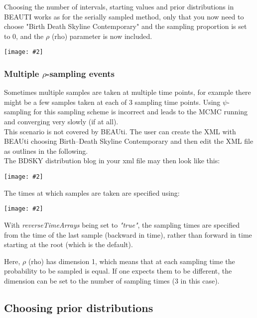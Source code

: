 \documentclass[11pt]{article}
\newcommand{\includeimage}[2][]{%
\texttt{[image: \#2]}
}
\begin{document}
Choosing the number of intervals, starting values and prior distributions in BEAUTI works as for the serially sampled method, only that you now need to choose "Birth Death Skyline Contemporary" and the sampling proportion is set to 0, and the $\rho$ (rho) parameter is now included.
\begin{center}
\includeimage[width=.5\linewidth]{figures/BEAUTI_bdsky_contemp}
\end{center}

\subsubsection{Multiple $\rho$-sampling events}
\label{Extensions}

Sometimes multiple samples are taken at multiple time points, for example there might be a few samples taken at each of 3 sampling time points. Using $\psi$-sampling for this sampling scheme is incorrect and leads to the MCMC running and converging very slowly (if at all).\\

This scenario is not covered by BEAUti. The user can create the XML with BEAUti choosing Birth--Death Skyline Contemporary and then edit the XML file as outlines in the following.\\

The BDSKY distribution blog in your xml file may then look like this: 
\begin{center}
\includeimage[width=\linewidth]{figures/multiplerho}
\end{center}

The times at which samples are taken are specified using:
\begin{center}
\includeimage[width=\linewidth]{figures/multiplerhotimes}
\end{center}
With {\it reverseTimeArrays} being set to {\it "true"}, the sampling times are specified from the time of the last sample (backward in time), rather than forward in time starting at the root (which is the default).

Here, $\rho$ (rho) has dimension 1, which means that at each sampling time the probability to be sampled is equal. If one expects them to be different, the dimension can be set to the number of sampling times (3 in this case).

\subsection{Choosing prior distributions}
\end{document}
